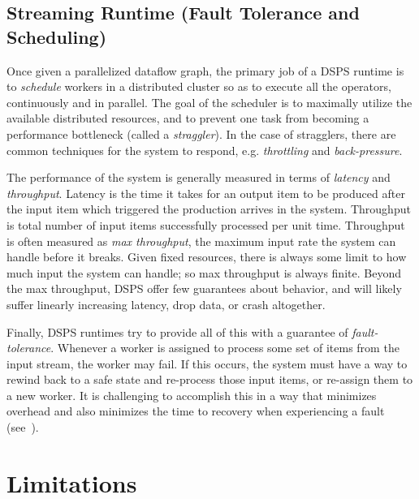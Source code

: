 \subsection{Streaming Runtime (Fault Tolerance and Scheduling)}

Once given a parallelized dataflow graph, the primary job of a DSPS runtime is to \emph{schedule} workers in a distributed cluster so as to execute all the operators, continuously and in parallel. The goal of the scheduler is to maximally utilize the available distributed resources, and to prevent one task from becoming a performance bottleneck (called a \emph{straggler}).
In the case of stragglers, there are common techniques for the system to respond, e.g. \emph{throttling} and \emph{back-pressure}.

The performance of the system is generally measured in terms of \emph{latency} and \emph{throughput}. Latency is the time it takes for an output item to be produced after the input item which triggered the production arrives in the system. Throughput is total number of input items successfully processed per unit time.
Throughput is often measured as \emph{max throughput}, the maximum input rate the system can handle before it breaks.
Given fixed resources, there is always some limit to how much input the system can handle; so max throughput is always finite. Beyond the max throughput, DSPS offer few guarantees about behavior, and will likely suffer linearly increasing latency, drop data, or crash altogether.

Finally, DSPS runtimes try to provide all of this with a guarantee of \emph{fault-tolerance}. Whenever a worker is assigned to process some set of items from the input stream, the worker may fail. If this occurs, the system must have a way to rewind back to a safe state and re-process those input items, or re-assign them to a new worker. It is challenging to accomplish this in a way that minimizes overhead and also minimizes the time to recovery when experiencing a fault (see~\cite{venkataraman2017drizzle}).

\section{Limitations}

